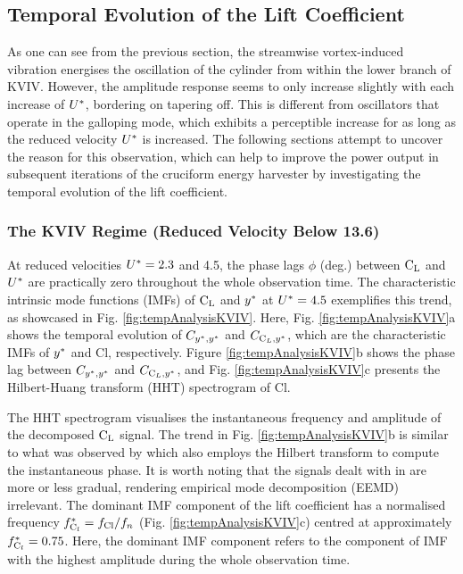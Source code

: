 \documentclass[oneside]{utmthesis}
\begin{document}
\subsection{Temporal Evolution of the Lift Coefficient} \label{ssec:tempEvo}
As one can see from the previous section, the streamwise vortex-induced vibration energises the oscillation of the cylinder from within the lower branch of KVIV. However, the amplitude response seems to only increase slightly with each increase of $U^{*}$, bordering on tapering off. This is different from oscillators that operate in the galloping mode, which exhibits a perceptible increase for as long as the reduced velocity $U^{*}$ is increased. The following sections attempt to uncover the reason for this observation, which can help to improve the power output in subsequent iterations of the cruciform energy harvester by investigating the temporal evolution of the lift coefficient.

\subsubsection{The KVIV Regime (Reduced Velocity Below 13.6)} \label{sssec:phaseLag}
At reduced velocities  $U^{*} = 2.3$ and 4.5, the phase lags  $\phi$ (deg.) between $\text{C}_{\text{L}}$ and  $U^{*}$ are practically zero throughout the whole observation time. The characteristic intrinsic mode functions (IMFs) of $\text{C}_{\text{L}}$ and  $y^{*}$ at $U^{*} = 4.5$ exemplifies this trend, as showcased in Fig. \ref{fig:tempAnalysisKVIV}. Here, Fig. \ref{fig:tempAnalysisKVIV}a shows the temporal evolution of $C_{y^{*},y^{*}}$ and $C_{\text{C}_{L},y^{*}}$, which are the characteristic IMFs of $y^{*}$ and Cl, respectively. Figure \ref{fig:tempAnalysisKVIV}b shows the phase lag between $C_{y^{*},y^{*}}$ and $C_{\text{C}_{L},y^{*}}$, and Fig. \ref{fig:tempAnalysisKVIV}c presents the Hilbert-Huang transform (HHT) spectrogram of Cl.

The HHT spectrogram visualises the instantaneous frequency and amplitude of the decomposed $\text{C}_{\text{L}}$ signal. The trend in Fig. \ref{fig:tempAnalysisKVIV}b is similar to what was observed by \citet{Khalak1999} which also employs the Hilbert transform to compute the instantaneous phase. It is worth noting that the signals dealt with in \citet{Khalak1999} are more or less gradual, rendering empirical mode decomposition (EEMD) irrelevant. The dominant IMF component of the lift coefficient has a normalised frequency $f_{\text{C}_{l}}^{*} = f_{\text{Cl}}/f_{n}$ (Fig. \ref{fig:tempAnalysisKVIV}c) centred at approximately $f_{\text{C}_{l}}^{*} = 0.75$. Here, the dominant IMF component refers to the component of IMF with the highest amplitude during the whole observation time.
\end{document}
